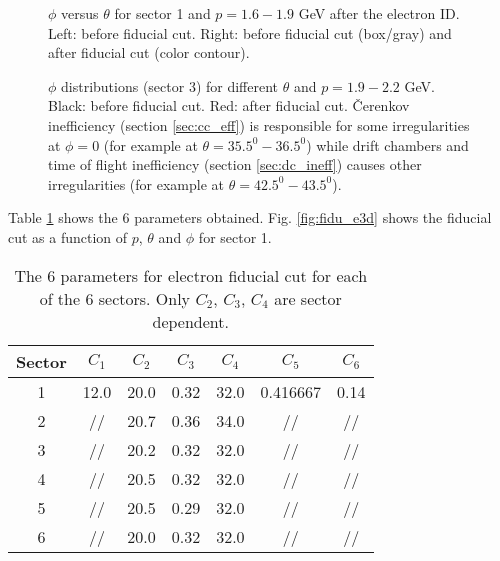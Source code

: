 \begin{figure}[ht]
	\centering
			\caption{$\phi$ versus $\theta$ for sector 1 and $p=1.6-1.9$ GeV after the
						electron ID. Left: before fiducial cut. Right: before fiducial cut
						(box/gray) and after fiducial cut (color contour). }
			\label{fig:fidu_etph}
\end{figure}


\begin{figure}[ht]
	\centering
			\caption{$\phi$ distributions (sector 3) for different $\theta$ and
						$p=1.9-2.2$ GeV. Black: before fiducial cut. Red: after fiducial cut.
						\v Cerenkov inefficiency (section \ref{sec:cc_eff}) is responsible
						for some irregularities at $\phi = 0$ (for example at
						$\theta = 35.5^0 - 36.5^0$) while drift chambers and time of flight
						inefficiency (section \ref{sec:dc_ineff}) causes other irregularities
						(for example at  $\theta = 42.5^0 - 43.5^0$).}
			\label{fig:fidu_ephis}
\end{figure}
\clearpage\newpage
Table \ref{tab:fid_epars} shows the 6 parameters obtained. Fig. \ref{fig:fidu_e3d} shows
the fiducial cut as a function of $p$, $\theta$ and $\phi$ for sector 1.
\vspace{1cm}
\begin{table}[h]
 \begin{center}
  \begin{tabular}{|c|c|c|c|c|c|c|}
    \hline 
   Sector & $C_1$ & $C_2$ & $C_3$ & $C_4$     & $C_5$ & $C_6$ \\
    \hline  
   1 &     12.0 &  20.0 &  0.32 &  32.0 &  0.416667 &  0.14 \\
   2 &     //   &  20.7 &  0.36 &  34.0 &  //       &  // \\
   3 &     //   &  20.2 &  0.32 &  32.0 &  //       &  // \\
   4 &     //   &  20.5 &  0.32 &  32.0 &  //       &  // \\
   5 &     //   &  20.5 &  0.29 &  32.0 &  //       &  // \\
   6 &     //   &  20.0 &  0.32 &  32.0 &  //       &  // \\
 \hline
  \end{tabular}
 \end{center} 
 \caption[The 6 parameters for electron fiducial cut for each of the 6 sectors.]
{ The 6 parameters for electron fiducial cut for each of the 6 sectors.
	            Only $C_2$, $C_3$, $C_4$ are sector dependent. }
 \label{tab:fid_epars}
\end{table}

